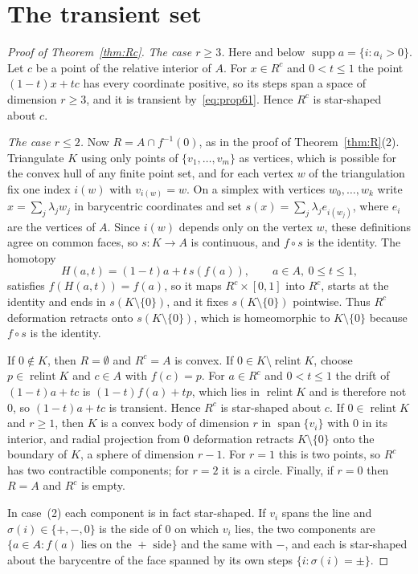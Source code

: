 \documentclass[11pt]{amsart}
\theoremstyle{remark}
\newcommand{\spn}{\operatorname{span}}
\newcommand{\supp}{\operatorname{supp}}
\newcommand{\relint}{\operatorname{relint}}
\begin{document}
\section{The transient set}\label{sec:Rc}

\begin{proof}[Proof of Theorem~\ref{thm:Rc}]
\emph{The case $r\ge3$.} Here and below $\supp a=\{i:a_i>0\}$. Let $c$ be a point of the relative interior of $A$. For $x\in R^c$ and $0<t\le1$ the point
$(1-t)x+tc$ has every coordinate positive, so its steps span a space of dimension $r\ge3$, and it is transient
by~\eqref{eq:prop61}. Hence $R^c$ is star-shaped about $c$.

\emph{The case $r\le2$.} Now $R=A\cap f^{-1}(0)$, as in the proof of Theorem~\ref{thm:R}(2). Triangulate $K$ using
only points of $\{v_1,\dots,v_m\}$ as vertices, which is possible for the convex hull of any finite point set, and
for each vertex $w$ of the triangulation fix one index $i(w)$ with $v_{i(w)}=w$. On a
simplex with vertices $w_0,\dots,w_k$ write $x=\sum_j\lambda_jw_j$ in barycentric coordinates and set
$s(x)=\sum_j\lambda_je_{i(w_j)}$, where $e_i$ are the vertices of $A$. Since $i(w)$ depends only on the vertex $w$,
these definitions agree on common faces, so
$s:K\to A$ is continuous, and $f\circ s$ is the identity. The homotopy
\[
H(a,t)=(1-t)a+t\,s(f(a)),\qquad a\in A,\ 0\le t\le1,
\]
satisfies $f(H(a,t))=f(a)$, so it maps $R^c\times[0,1]$ into $R^c$, starts at the identity and ends in
$s(K\setminus\{0\})$, and it fixes $s(K\setminus\{0\})$ pointwise. Thus $R^c$ deformation retracts onto
$s(K\setminus\{0\})$, which is homeomorphic to $K\setminus\{0\}$ because $f\circ s$ is the identity.

If $0\notin K$, then $R=\emptyset$ and $R^c=A$ is convex. If $0\in K\setminus\relint K$, choose $p\in\relint K$ and
$c\in A$ with $f(c)=p$. For $a\in R^c$ and $0<t\le1$ the drift of $(1-t)a+tc$ is $(1-t)f(a)+tp$, which lies in
$\relint K$ and is therefore not $0$, so $(1-t)a+tc$ is transient. Hence $R^c$ is star-shaped about $c$.
If $0\in\relint K$ and $r\ge1$, then $K$ is a convex body of dimension $r$ in $\spn\{v_i\}$ with $0$ in its interior,
and radial projection from $0$ deformation retracts $K\setminus\{0\}$ onto the boundary of $K$, a sphere of dimension
$r-1$. For $r=1$ this is two points, so $R^c$ has two contractible components; for $r=2$ it is a circle. Finally, if
$r=0$ then $R=A$ and $R^c$ is empty.

In case~(2) each component is in fact star-shaped. If $v_i$ spans the line and $\sigma(i)\in\{+,-,0\}$ is the side of
$0$ on which $v_i$ lies, the two components are $\{a\in A: f(a)\text{ lies on the }+\text{ side}\}$ and the same with
$-$, and each is star-shaped about the barycentre of the face spanned by its own steps $\{i:\sigma(i)=\pm\}$.
\end{proof}
\end{document}
